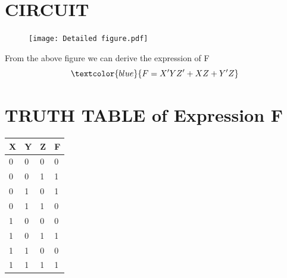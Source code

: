 \documentclass{report}
\begin{document}
\newpage
\section{CIRCUIT}
\begin{figure}[htp]
        \centering
        \texttt{[image: Detailed figure.pdf]}
         \caption{}
        \label{fig:ok}
\end{figure}
\newline
From the above figure we can derive the expression of F
\newline
\begin{equation}
   \textcolor{blue}{F = X'YZ'+XZ+Y'Z}
\end{equation}


\newpage
\section{TRUTH TABLE of Expression F}


\begin{table}[]\centering
    \begin{tabular}{|l|l|l|l|}
         \hline
        X & Y & Z & F  \\ \hline
        0 & 0 & 0     & 0  \\
        0 & 0 & 1     & 1  \\
        0 & 1 & 0     & 1   \\ 
        0 & 1 & 1     & 0   \\
        1 & 0 & 0     & 0   \\
        1 & 0 & 1     & 1   \\
        1 & 1 & 0     & 0   \\
        1 & 1 & 1     & 1    \\ 
        \hline

\end{tabular}
\end{table}
\end{document}
